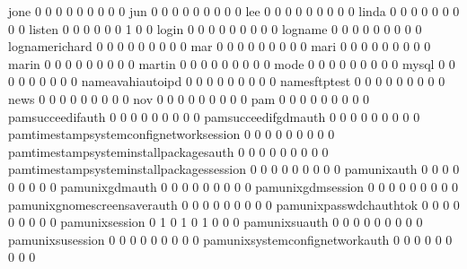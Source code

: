 \documentclass[compress,8pt]{beamer}
\begin{document}
\begin{frame}
\begin{Schunk}
  jone                                       0   0   0   0   0   0   0   0   0
  jun                                        0   0   0   0   0   0   0   0   0
  lee                                        0   0   0   0   0   0   0   0   0
  linda                                      0   0   0   0   0   0   0   0   0
  listen                                     0   0   0   0   0   0   1   0   0
  login                                      0   0   0   0   0   0   0   0   0
  logname                                    0   0   0   0   0   0   0   0   0
  lognamerichard                             0   0   0   0   0   0   0   0   0
  mar                                        0   0   0   0   0   0   0   0   0
  mari                                       0   0   0   0   0   0   0   0   0
  marin                                      0   0   0   0   0   0   0   0   0
  martin                                     0   0   0   0   0   0   0   0   0
  mode                                       0   0   0   0   0   0   0   0   0
  mysql                                      0   0   0   0   0   0   0   0   0
  nameavahiautoipd                           0   0   0   0   0   0   0   0   0
  namesftptest                               0   0   0   0   0   0   0   0   0
  news                                       0   0   0   0   0   0   0   0   0
  nov                                        0   0   0   0   0   0   0   0   0
  pam                                        0   0   0   0   0   0   0   0   0
  pamsucceedifauth                           0   0   0   0   0   0   0   0   0
  pamsucceedifgdmauth                        0   0   0   0   0   0   0   0   0
  pamtimestampsystemconfignetworksession     0   0   0   0   0   0   0   0   0
  pamtimestampsysteminstallpackagesauth      0   0   0   0   0   0   0   0   0
  pamtimestampsysteminstallpackagessession   0   0   0   0   0   0   0   0   0
  pamunixauth                                0   0   0   0   0   0   0   0   0
  pamunixgdmauth                             0   0   0   0   0   0   0   0   0
  pamunixgdmsession                          0   0   0   0   0   0   0   0   0
  pamunixgnomescreensaverauth                0   0   0   0   0   0   0   0   0
  pamunixpasswdchauthtok                     0   0   0   0   0   0   0   0   0
  pamunixsession                             0   1   0   1   0   1   0   0   0
  pamunixsuauth                              0   0   0   0   0   0   0   0   0
  pamunixsusession                           0   0   0   0   0   0   0   0   0
  pamunixsystemconfignetworkauth             0   0   0   0   0   0   0   0   0

\end{Schunk}
\end{frame}
\end{document}
